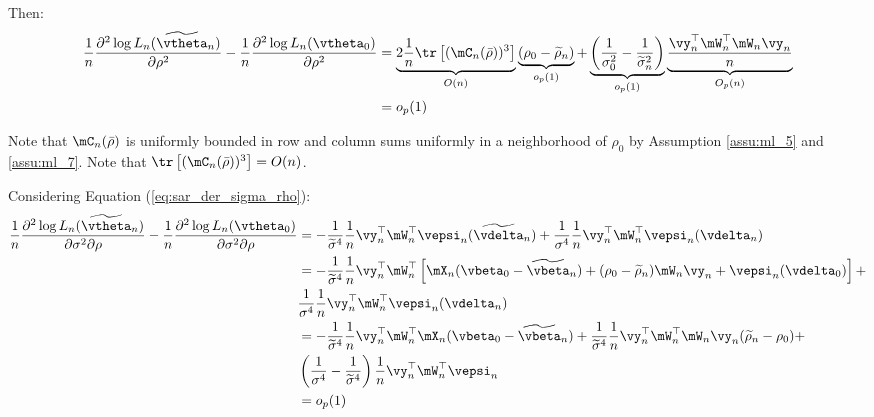\documentclass[english,12pt]{book}\usepackage[]{graphicx}\usepackage[]{xcolor}
\begin{document}
\begin{subappendices}
\begin{enumerate}
   Then:
\begin{equation*}
    \begin{aligned}
    \frac{1}{n}\frac{\partial^2 \log L_n(\widetilde{\vtheta}_n)}{\partial \rho^2} - \frac{1}{n}\frac{\partial^2 \log L_n(\vtheta_0)}{\partial\rho^2} & = \underbrace{2\frac{1}{n}\tr\left[(\mC_n(\bar{\rho}))^3\right]}_{O(n)} \underbrace{(\rho_0 - \widetilde{\rho}_n)}_{o_p(1)} + \underbrace{\left(\frac{1}{\sigma^2_0} - \frac{1}{\widetilde{\sigma}^2_n}\right)}_{o_p(1)}\underbrace{\frac{\vy_n^{\top}\mW^{\top}_n\mW_n\vy_n}{n}}_{O_p(n)} \\
    & = o_p(1)
    \end{aligned}
\end{equation*}
   
   Note that $\mC_n(\bar{\rho})$ is uniformly bounded in row and column sums uniformly in a neighborhood of $\rho_0$ by  Assumption \ref{assu:ml_5} and \ref{assu:ml_7}. Note that $\tr\left[(\mC_n(\bar{\rho}))^3\right] = O(n)$.
   
  Considering Equation (\ref{eq:sar_der_sigma_rho}):
    \begin{equation*}
    \begin{aligned}
    \frac{1}{n}\frac{\partial^2 \log L_n(\widetilde{\vtheta}_n)}{\partial \sigma^2 \partial \rho} - \frac{1}{n}\frac{\partial^2 \log L_n(\vtheta_0)}{\partial \sigma^2 \partial \rho}& = -\frac{1}{\widetilde{\sigma}^4}\frac{1}{n}\vy_n^\top\mW_n^\top\vepsi_n(\widetilde{\vdelta}_n) + \frac{1}{\sigma^4}\frac{1}{n}\vy_n^\top\mW_n^\top\vepsi_n(\vdelta_n)\\
    & = -\frac{1}{\widetilde{\sigma}^4}\frac{1}{n}\vy_n^\top\mW_n^\top\left[\mX_n(\vbeta_0 - \widetilde{\vbeta}_n) + (\rho_0 - \widetilde{\rho}_n)\mW_n\vy_n + \vepsi_n(\vdelta_0)\right] + \\
    &  \frac{1}{\sigma^4}\frac{1}{n}\vy_n^\top\mW_n^\top\vepsi_n(\vdelta_n) \\
    &= -\frac{1}{\widetilde{\sigma}^4}\frac{1}{n}\vy_n^\top\mW_n^\top\mX_n(\vbeta_0 - \widetilde{\vbeta}_n)  + \frac{1}{\widetilde{\sigma}^4}\frac{1}{n}\vy_n^\top\mW_n^\top\mW_n\vy_n(\widetilde{\rho}_n-\rho_0) + \\
    & \left(\frac{1}{\sigma^4}-\frac{1}{\widetilde{\sigma}^4}\right)\frac{1}{n}\vy_n^\top\mW_n^\top\vepsi_{n} \\
    & = o_p(1)
    \end{aligned}
   \end{equation*}
   

\end{enumerate}
\end{subappendices}
\end{document}
